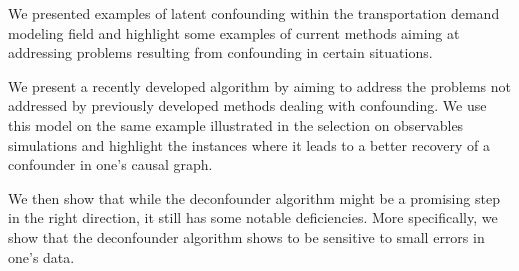 We presented examples of latent confounding within the transportation demand modeling field and highlight 
some examples of current methods aiming at addressing problems resulting from confounding in certain situations.

We present a recently developed algorithm by \citet{wang_2019_blessings} aiming to address the problems not 
addressed by previously developed methods dealing with confounding. We use this model on the same example illustrated in
the selection on observables simulations and highlight the instances where it leads to a better recovery of 
a confounder in one's causal graph. 

We then show that while the deconfounder algorithm might be a promising step in the right direction, 
it still has some notable deficiencies. More specifically, we show that the deconfounder algorithm shows 
to be sensitive to small errors in one's data.
